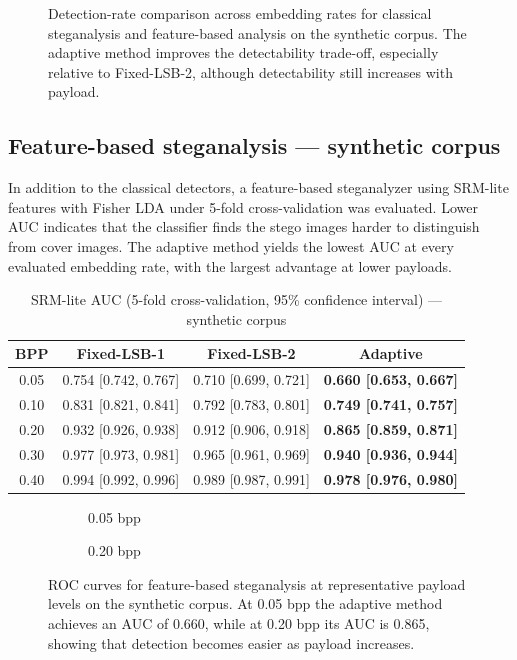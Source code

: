 \begin{figure}[H]
    \centering
    \caption{Detection-rate comparison across embedding rates for classical steganalysis and feature-based analysis on the synthetic corpus. The adaptive method improves the detectability trade-off, especially relative to Fixed-LSB-2, although detectability still increases with payload.}
    \label{fig:detection_rates}
\end{figure}

\subsection{Feature-based steganalysis --- synthetic corpus}
In addition to the classical detectors, a feature-based steganalyzer using SRM-lite features with Fisher LDA under 5-fold cross-validation was evaluated. Lower AUC indicates that the classifier finds the stego images harder to distinguish from cover images. The adaptive method yields the lowest AUC at every evaluated embedding rate, with the largest advantage at lower payloads.

\begin{table}[H]
\centering
\caption{SRM-lite AUC (5-fold cross-validation, 95\% confidence interval) --- synthetic corpus}
\label{tab:srm_auc}
\begin{tabular}{cccc}
\toprule
BPP & Fixed-LSB-1 & Fixed-LSB-2 & Adaptive \\
\midrule
0.05 & 0.754 [0.742, 0.767] & 0.710 [0.699, 0.721] & \textbf{0.660 [0.653, 0.667]} \\
0.10 & 0.831 [0.821, 0.841] & 0.792 [0.783, 0.801] & \textbf{0.749 [0.741, 0.757]} \\
0.20 & 0.932 [0.926, 0.938] & 0.912 [0.906, 0.918] & \textbf{0.865 [0.859, 0.871]} \\
0.30 & 0.977 [0.973, 0.981] & 0.965 [0.961, 0.969] & \textbf{0.940 [0.936, 0.944]} \\
0.40 & 0.994 [0.992, 0.996] & 0.989 [0.987, 0.991] & \textbf{0.978 [0.976, 0.980]} \\
\bottomrule
\end{tabular}
\end{table}

\begin{figure}[H]
    \centering
    \begin{subfigure}{0.48\linewidth}
        \caption{0.05 bpp}
    \end{subfigure}
    \hfill
    \begin{subfigure}{0.48\linewidth}
        \caption{0.20 bpp}
    \end{subfigure}
    \caption{ROC curves for feature-based steganalysis at representative payload levels on the synthetic corpus. At 0.05 bpp the adaptive method achieves an AUC of 0.660, while at 0.20 bpp its AUC is 0.865, showing that detection becomes easier as payload increases.}
    \label{fig:roc_curves}
\end{figure}


